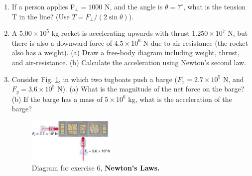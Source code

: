 \documentclass[10pt]{article}
\begin{document}
\begin{enumerate}
\item If a person applies F$_{\perp} = 1000$ N, and the angle is $\theta=7^{\circ}$, what is the tension T in the line?  (Use $T = F_{\perp}/(2\sin\theta)$). \vspace{2.5cm}
\item A $5.00\times 10^5$ kg rocket is accelerating upwards with thrust $1.250\times 10^7$ N, but there is also a downward force of $4.5\times 10^6$ N due to air resistance (the rocket also has a weight). (a) Draw a free-body diagram including weight, thrust, and air-resistance.  (b) Calculate the acceleration using Newton's second law. \\ \vspace{2.5cm}
\item Consider Fig. \ref{fig:tug}, in which two tugboats push a barge ($F_x = 2.7\times 10^5$ N, and $F_y = 3.6\times 10^5$ N).  (a) What is the magnitude of the net force on the barge? (b) If the barge has a mass of $5\times 10^6$ kg, what is the acceleration of the barge? \vspace{2.5cm}
\begin{figure}[h]
\centering
\includegraphics[width=0.4\textwidth]{figures/tug.png}
\caption{\label{fig:tug} Diagram for exercise 6, \textbf{Newton's Laws.}}
\end{figure}
\end{enumerate}
\end{document}
